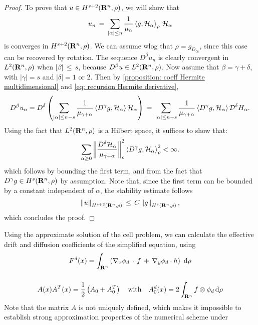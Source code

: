 \begin{proof}
    To prove that $u\in H^{s+2}(\mathbf R^n, \rho)$, we will show that 
    $$
        u_n \,=\, \sum_{|\alpha| \leq n} \frac{1}{\mu_\alpha} \left \langle g,\mathcal
            H_\alpha \right\rangle_\rho\, \mathcal H_\alpha
    $$
    is converges in $H^{s+2}(\mathbf R^n, \rho)$.
    We can assume wlog that $\rho = g_{D_\infty}$, since this case can be
    recovered by rotation.  The sequence $D^\beta u_n$ is clearly convergent in
    $L^{2}(\mathbf R^n,\rho)$ when $|\beta| \,\leq\, s$, because $D^\beta u \in
    L^{2}(\mathbf R^n,\rho)$. Now assume that $\beta=\gamma + \delta$, with
    $|\gamma| = s$ and $|\delta| = 1$ or 2. Then by \cref{proposition: coeff
        Hermite multidimensional} and \cref{eq: recursion Hermite derivative},
    $$
        D^\beta u_n =D^\delta \left(\sum_{|\alpha|\leq n-s}\frac{1}{\mu_{\gamma+ \alpha}}\left \langle D^\gamma g,\mathcal H_\alpha \right\rangle\mathcal  H_\alpha \right) \,=\, \sum_{|\alpha|\leq n-s}\frac{1}{\mu_{\gamma+ \alpha}}\left \langle D^\gamma g,\mathcal H_\alpha \right\rangle\mathcal  D^\delta H_\alpha. 
    $$
    Using the fact that $L^{2}(\mathbf R^n, \rho)$ is a Hilbert space, it
    suffices to show that: 
    $$
        \sum_{\alpha\geq 0}\left\| \frac{D^\delta \mathcal H_\alpha}{\mu_{\gamma+
                    \alpha}} \right\|_{\rho}^2 \left \langle D^\gamma g,\mathcal
            H_\alpha \right\rangle_{\rho}^2 < \infty.   
    $$
    which follows by bounding the first term, and from the fact that $D^\gamma
    g \in H^{s}(\mathbf R^n, \rho)$ by assumption. Note that, since the
    first term can be bounded by a constant independent of $\alpha$, the
    stability estimate follows
    $$
        \left\| u \right\|_{H^{s+2}(\mathbf R^n, \rho)} \,\leq\, C \left\| g \right\|_{H^{s}(\mathbf R^n, \rho)},
    $$
    which concludes the proof.
\end{proof} \fi
Using the approximate solution of the cell problem, we can calculate the
effective drift and diffusion coefficients of the simplified equation, using
\begin{equation}
    \begin{gathered}
        F^d (x) = \int_{\mathbf R^n} \left(\nabla_x \phi_d\,\cdot\,f\,+\,\nabla_y \phi_d \cdot h\right) \,\,\mathrm d \rho \\[0.5cm]
        A(x) A^T(x) = \frac{1}{2}\left(A_0 + A_0^T\right) \quad \text{with}\quad A_0^d (x) = 2 \int_{\mathbf R^n}  f \otimes \phi_d \,\mathrm d \rho
    \end{gathered}
    \label{eq: coefficients of approximate equation}
\end{equation}
Note that the matrix $A$ is not uniquely defined, which makes it impossible to
establish strong approximation properties of the numerical scheme under

